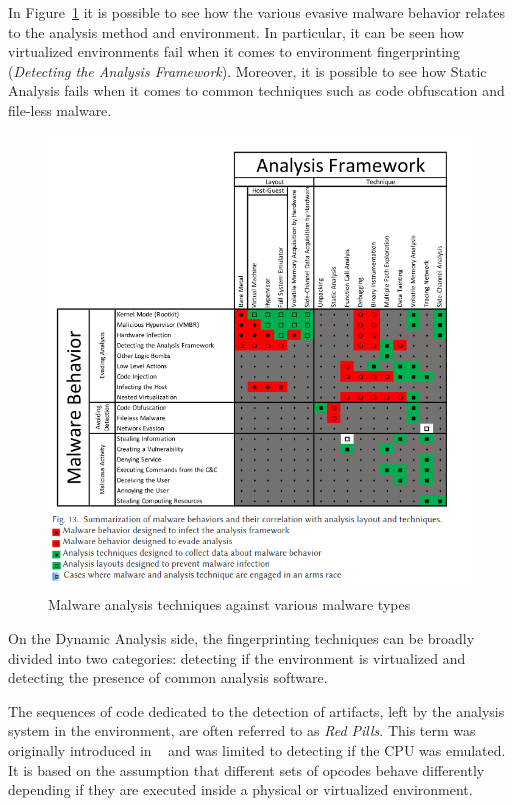 In Figure~\ref{fig:mfrm} it is possible to see how the various evasive malware behavior relates to the analysis method and environment. In particular, it can be seen how virtualized environments fail when it comes to environment fingerprinting (\textit{Detecting the Analysis Framework}). Moreover, it is possible to see how Static Analysis fails when it comes to common techniques such as code obfuscation and file-less malware.

\noindent
\begin{figure}[htp]
\centering
\includegraphics[width=\linewidth]{images/mal-fram.png}
\caption{Malware analysis techniques against various malware types}
\label{fig:mfrm}
\end{figure}

On the Dynamic Analysis side, the fingerprinting techniques can be broadly divided into two categories: detecting if the environment is virtualized and detecting the presence of common analysis software. 

The sequences of code dedicated to the detection of artifacts, left by the analysis system in the environment, are often referred to as \textit{Red Pills}. This term was originally introduced in ~\cite{bruschi} and was limited to detecting if the CPU was emulated. It is based on the assumption that different sets of opcodes behave differently depending if they are executed inside a physical or virtualized environment. 

